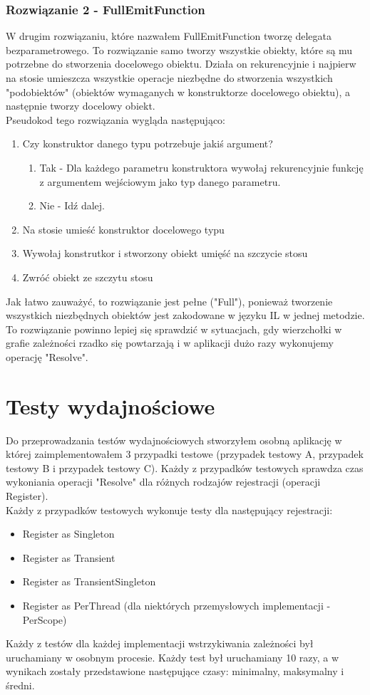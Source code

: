 \documentclass[12pt]{article}
\begin{document}
\subsubsection{Rozwiązanie 2 - FullEmitFunction}
W drugim rozwiązaniu, które nazwałem FullEmitFunction tworzę delegata bezparametrowego. To rozwiązanie samo tworzy  wszystkie obiekty, które są mu potrzebne do stworzenia docelowego obiektu. Działa on rekurencyjnie i najpierw na stosie umieszcza wszystkie operacje niezbędne do stworzenia wszystkich "podobiektów" (obiektów wymaganych w konstruktorze docelowego obiektu), a następnie tworzy docelowy obiekt.\\
Pseudokod tego rozwiązania wygląda następująco:
\begin{enumerate}
	\item Czy konstruktor danego typu potrzebuje jakiś argument?
	\begin{enumerate}
		\item Tak - Dla każdego parametru konstruktora wywołaj rekurencyjnie funkcję z argumentem wejściowym jako typ danego parametru.
		\item Nie - Idź dalej.
	\end{enumerate}
	\item Na stosie umieść konstruktor docelowego typu
	\item Wywołaj konstrutkor i stworzony obiekt umięść na szczycie stosu
	\item Zwróć obiekt ze szczytu stosu
\end{enumerate}
Jak łatwo zauważyć, to rozwiązanie jest pełne ("Full"), ponieważ tworzenie wszystkich niezbędnych obiektów jest zakodowane w języku IL w jednej metodzie.\\
To rozwiązanie powinno lepiej się sprawdzić w sytuacjach, gdy wierzchołki w grafie zależności rzadko się powtarzają i w aplikacji dużo razy wykonujemy operację "Resolve".



\clearpage

\section{Testy wydajnościowe}
Do przeprowadzania testów wydajnościowych stworzyłem osobną aplikację w której zaimplementowałem 3 przypadki testowe (przypadek testowy A, przypadek testowy B i przypadek testowy C). Każdy z przypadków testowych sprawdza czas wykoniania operacji "Resolve" dla różnych rodzajów rejestracji (operacji Register).\\
Każdy z przypadków testowych wykonuje testy dla następujący rejestracji:
\begin{itemize}
	\item Register as Singleton
	\item Register as Transient
	\item Register as TransientSingleton
	\item Register as PerThread (dla niektórych przemysłowych implementacji - PerScope)
\end{itemize}
Każdy z testów dla każdej implementacji wstrzykiwania zależności był uruchamiany w osobnym procesie. Każdy test był uruchamiany {\color{red}10} razy, a w wynikach zostały przedstawione następujące czasy: minimalny,  maksymalny i średni.
\end{document}
